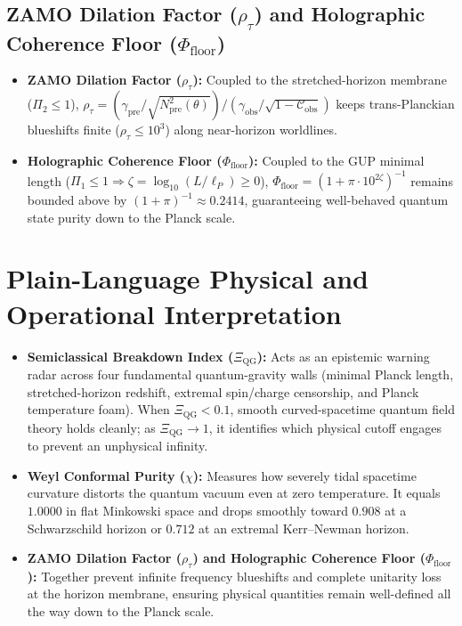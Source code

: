 \documentclass[11pt,a4paper]{article}
\begin{document}
\subsection{ZAMO Dilation Factor ($\rho_\tau$) and Holographic Coherence Floor ($\Phi_{\text{floor}}$)}
\begin{itemize}[leftmargin=1.5em]
    \item \textbf{ZAMO Dilation Factor ($\rho_\tau$):} Coupled to the stretched-horizon membrane ($\Pi_2 \le 1$), $\rho_\tau = (\gamma_{\text{pre}} / \sqrt{N^2_{\text{pre}}(\theta)}) / (\gamma_{\text{obs}} / \sqrt{1 - \mathcal{C}_{\text{obs}}})$ keeps trans-Planckian blueshifts finite ($\rho_\tau \le 10^3$) along near-horizon worldlines.
    \item \textbf{Holographic Coherence Floor ($\Phi_{\text{floor}}$):} Coupled to the GUP minimal length ($\Pi_1 \le 1 \Rightarrow \zeta = \log_{10}(L/\ell_P) \ge 0$), $\Phi_{\text{floor}} = (1 + \pi \cdot 10^{2\zeta})^{-1}$ remains bounded above by $(1 + \pi)^{-1} \approx 0.2414$, guaranteeing well-behaved quantum state purity down to the Planck scale.
\end{itemize}

\section{Plain-Language Physical and Operational Interpretation}

\begin{itemize}[leftmargin=1.5em]
    \item \textbf{Semiclassical Breakdown Index ($\Xi_{\text{QG}}$):} Acts as an epistemic warning radar across four fundamental quantum-gravity walls (minimal Planck length, stretched-horizon redshift, extremal spin/charge censorship, and Planck temperature foam). When $\Xi_{\text{QG}} < 0.1$, smooth curved-spacetime quantum field theory holds cleanly; as $\Xi_{\text{QG}} \to 1$, it identifies which physical cutoff engages to prevent an unphysical infinity.
    \item \textbf{Weyl Conformal Purity ($\chi$):} Measures how severely tidal spacetime curvature distorts the quantum vacuum even at zero temperature. It equals $1.0000$ in flat Minkowski space and drops smoothly toward $0.908$ at a Schwarzschild horizon or $0.712$ at an extremal Kerr--Newman horizon.
    \item \textbf{ZAMO Dilation Factor ($\rho_\tau$) and Holographic Coherence Floor ($\Phi_{\text{floor}}$):} Together prevent infinite frequency blueshifts and complete unitarity loss at the horizon membrane, ensuring physical quantities remain well-defined all the way down to the Planck scale.
\end{itemize}
\end{document}
